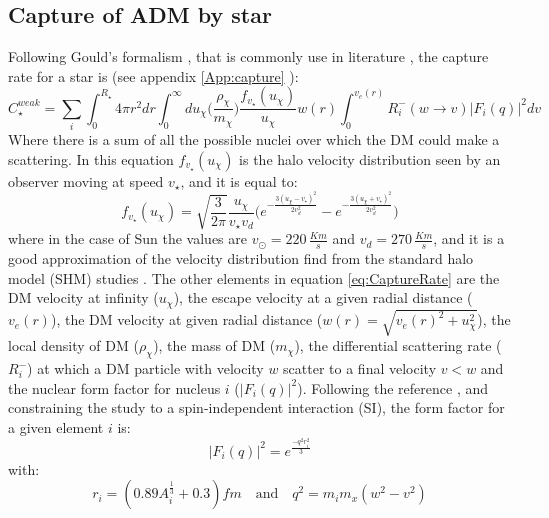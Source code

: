 \subsection{Capture of ADM by star}
Following Gould's formalism \cite{Gould:1987ir,1985ApJ...296..679P}, that is commonly use in literature \cite{DMSun,Zentner_2009}, the capture rate for a star is (see appendix \ref{App:capture} ):
\begin{equation}
\label{eq:CaptureRate}
    C^{weak}_{\star}=\sum_i \int_0^{R_{\star}} 4\pi r^2dr\int_0^{\infty}du_{\chi}\big(\frac{\rho_{\chi}}{m_{\chi}}\big)\frac{f_{v_{\star}}(u_{\chi})}{u_{\chi}}w(r)\int_0^{v_e(r)}R_i^-(w\to v)|F_i(q)|^2 dv
\end{equation}
Where there is a sum of all the possible nuclei over which the DM could make a scattering. In this equation $f_{v_{\star}}(u_{\chi})$ is the halo velocity distribution seen by an observer moving at speed $v_{\star}$, and it is equal to\cite{DMSun}:
\begin{equation*}
    f_{v_{\star}}(u_{\chi})=\sqrt{\frac{3}{2\pi}}\frac{u_{\chi}}{v_{\star}v_d}\Big(e^{-\frac{3(u_{\chi}-v_{\star})^2}{2v_d^2}}-e^{-\frac{3(u_{\chi}+v_{\star})^2}{2v_d^2}}\Big)
\end{equation*}
where in the case of Sun  the values are  $v_{\odot}= 220\, \frac{Km}{s}$ and $v_d= 270 \, \frac{Km}{s}$, and it is a good approximation of the velocity distribution find from the standard halo model (SHM) studies \cite{evans2018shm}. The other elements in equation \ref{eq:CaptureRate} are the DM velocity at infinity ($u_{\chi}$), the escape velocity at a given radial distance ($v_e(r)$), the DM velocity at given radial distance ($w(r)=\sqrt{v_e(r)^2+u_{\chi}^2}$), the local density of DM ($\rho_{\chi}$), the mass of DM ($m_{\chi}$), the differential scattering rate ($R_i^-$) at which a DM particle with velocity $w$ scatter to a final velocity $v<w$  and the nuclear form factor for nucleus $i$ ($|F_i(q)|^2$). Following the reference \cite{DMSun}, and constraining the study to a spin-independent interaction (SI), the form factor for a given element $i$ is:
\begin{equation*}
    |F_i(q)|^2=e^{\frac{-q^2r_i^2}{3}}
\end{equation*}
with:
\begin{equation*}
    r_i=(0.89A_i^{\frac13}+0.3) fm \quad \textrm{and} \quad q^2=m_im_x(w^2-v^2)
\end{equation*}

